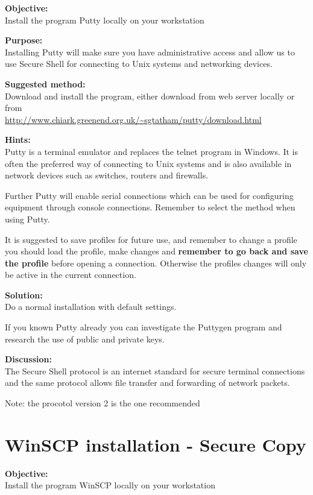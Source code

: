 \documentclass[a4paper,11pt,notitlepage]{report}
\begin{document}
{\bf Objective:}\\
Install the program Putty locally on your workstation

{\bf Purpose:}\\
Installing Putty will make sure you have administrative access and allow us to use Secure Shell for connecting to Unix systems and networking devices.

{\bf Suggested method:}\\
Download and install the program, either download from web server locally or from\\
\url{http://www.chiark.greenend.org.uk/~sgtatham/putty/download.html}


{\bf Hints:}\\
Putty is a terminal emulator and replaces the telnet program in Windows.
It is often the preferred way of connecting to Unix systems and is also
available in network devices such as switches, routers and firewalls.

Further Putty will enable serial connections which can be used for configuring
equipment through console connections. Remember to select the method
when using Putty.

It is suggested to save profiles for future use, and remember to change a
profile you should load the profile, make changes and {\bf remember to go back
and save the profile} before opening a connection. Otherwise the profiles changes
will only be active in the current connection.

{\bf Solution:}\\
Do a normal installation with default settings.

If you known Putty already you can investigate the Puttygen program and
research the use of public and private keys.

{\bf Discussion:}\\
The Secure Shell protocol is an internet standard for secure terminal connections
and the same protocol allows file transfer and forwarding of network packets.

Note: the procotol version 2 is the one recommended

\chapter{WinSCP installation - Secure Copy}
\label{ex:winscp-install}


{\bf Objective:}\\
Install the program WinSCP locally on your workstation
\end{document}
